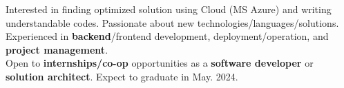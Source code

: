 

\begin{cvparagraph}

  Interested in finding optimized solution using Cloud (MS Azure) and writing understandable codes. Passionate about new technologies/languages/solutions. Experienced in \textbf{backend}/frontend development, deployment/operation, and \textbf{project management}. \\
  Open to \textbf{internships/co-op} opportunities as a \textbf{software developer} or \textbf{solution architect}. Expect to graduate in May. 2024.
\end{cvparagraph}
